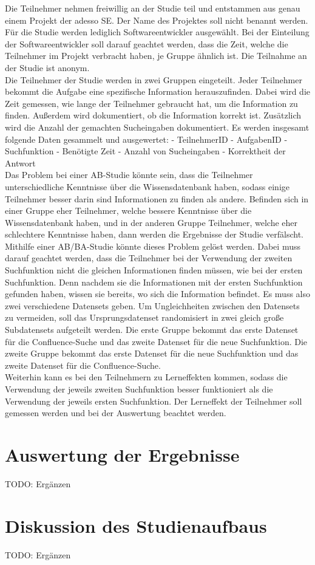 Die Teilnehmer nehmen freiwillig an der Studie teil und entstammen aus genau einem Projekt der adesso SE.
Der Name des Projektes soll nicht benannt werden.
Für die Studie werden lediglich Softwareentwickler ausgewählt.
Bei der Einteilung der Softwareentwickler soll darauf geachtet werden, dass die Zeit, welche die Teilnehmer im Projekt verbracht haben, je Gruppe ähnlich ist.
Die Teilnahme an der Studie ist anonym.\\

Die Teilnehmer der Studie werden in zwei Gruppen eingeteilt.
Jeder Teilnehmer bekommt die Aufgabe eine spezifische Information herauszufinden.
Dabei wird die Zeit gemessen, wie lange der Teilnehmer gebraucht hat, um die Information zu finden.
Außerdem wird dokumentiert, ob die Information korrekt ist.
Zusätzlich wird die Anzahl der gemachten Sucheingaben dokumentiert.
Es werden insgesamt folgende Daten gesammelt und ausgewertet:
-	TeilnehmerID
-	AufgabenID
-	Suchfunktion
-	Benötigte Zeit
-	Anzahl von Sucheingaben
-	Korrektheit der Antwort\\

Das Problem bei einer AB-Studie könnte sein, dass die Teilnehmer unterschiedliche Kenntnisse über die Wissensdatenbank haben, sodass einige Teilnehmer besser darin sind Informationen zu finden als andere.
Befinden sich in einer Gruppe eher Teilnehmer, welche bessere Kenntnisse über die Wissensdatenbank haben, und in der anderen Gruppe Teilnehmer, welche eher schlechtere Kenntnisse haben, dann werden die Ergebnisse der Studie verfälscht.
Mithilfe einer AB/BA-Studie könnte dieses Problem gelöst werden.
Dabei muss darauf geachtet werden, dass die Teilnehmer bei der Verwendung der zweiten Suchfunktion nicht die gleichen Informationen finden müssen, wie bei der ersten Suchfunktion.
Denn nachdem sie die Informationen mit der ersten Suchfunktion gefunden haben, wissen sie bereits, wo sich die Information befindet.
Es muss also zwei verschiedene Datensets geben.
Um Ungleichheiten zwischen den Datensets zu vermeiden, soll das Ursprungsdatenset randomisiert in zwei gleich große Subdatensets aufgeteilt werden.
Die erste Gruppe bekommt das erste Datenset für die Confluence-Suche und das zweite Datenset für die neue Suchfunktion.
Die zweite Gruppe bekommt das erste Datenset für die neue Suchfunktion und das zweite Datenset für die Confluence-Suche.\\

Weiterhin kann es bei den Teilnehmern zu Lerneffekten kommen, sodass die Verwendung der jeweils zweiten Suchfunktion besser funktioniert als die Verwendung der jeweils ersten Suchfunktion.
Der Lerneffekt der Teilnehmer soll gemessen werden und bei der Auswertung beachtet werden.


\section{Auswertung der Ergebnisse}
TODO: Ergänzen


\section{Diskussion des Studienaufbaus}
TODO: Ergänzen
